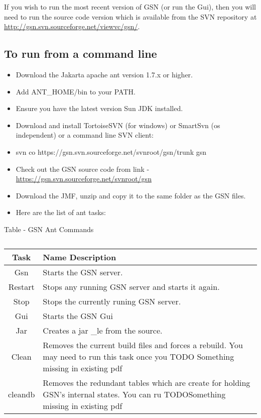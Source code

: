 If you wish to run the most recent version of GSN (or run the Gui),
then you will need to run the source code version which is available
from the SVN repository at
\url{http://gsn.svn.sourceforge.net/viewvc/gsn/}.

\subsection{To run from a command line}

\begin{itemize}
	\item Download the Jakarta apache ant version 1.7.x or higher.
	\item Add ANT\_HOME/bin to your PATH.
	\item Ensure you have the latest version Sun JDK installed.
	\item Download and install TortoiseSVN (for windows) or SmartSvn (os
independent) or a command line SVN client:
	\item svn co https://gsn.svn.sourceforge.net/svnroot/gsn/trunk gsn
	\item Check out the GSN source code from link -
\url{https://gsn.svn.sourceforge.net/svnroot/gsn}
	\item Download the JMF, unzip and copy it to the same folder as the GSN
files.
	\item Here are the list of ant tasks:
\end{itemize}



Table  - GSN Ant Commands

\setlength{\tymin}{10pt}
\setlength{\tymax}{0.8\textwidth}
\begin{table*}[!htp] 
\centering
{\normalfont\footnotesize
\begin{tabulary}{\textwidth}{|C|J|}%
\hline

Task
 & 
Name Description
 \\
\hline

Gsn
 & 
Starts the GSN server.
 \\
\hline

Restart
 & 
Stops any running GSN server and starts it again.
 \\
\hline

Stop
 & 
Stops the currently runing GSN server.
 \\
\hline

Gui
 & 
Starts the GSN Gui
 \\
\hline

Jar
 & 
Creates a jar \_le from the source.
 \\
\hline

Clean
 & 
Removes the current build files and forces a rebuild. You may need to
run this task once you TODO Something missing in existing pdf
 \\
\hline

cleandb
 & 
Removes the redundant tables which are create for holding GSN's
internal states. You can ru TODOSomething missing in existing pdf
 \\
\hline
\end{tabulary}
}\caption{}
\label{table:gsn_ant_tasks}
\end{table*}

